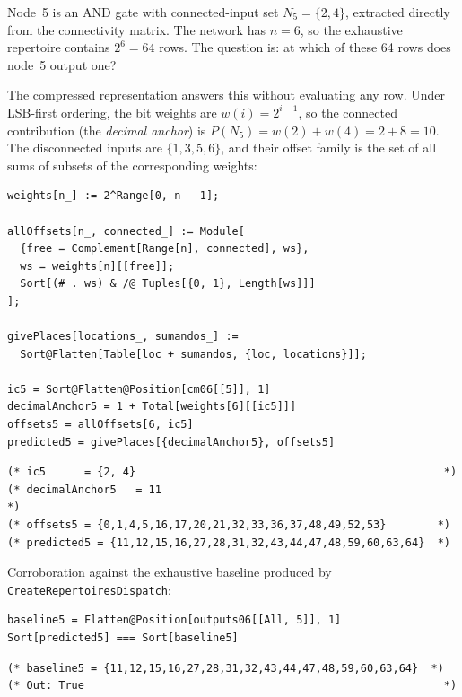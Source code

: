 \documentclass[11pt]{article}
\begin{document}
Node~5 is an AND gate with connected-input set $N_5=\{2,4\}$, extracted
directly from the connectivity matrix.
The network has $n=6$, so the exhaustive repertoire contains $2^6=64$ rows.
The question is: at which of these 64 rows does node~5 output one?

The compressed representation answers this without evaluating any row.
Under LSB-first ordering, the bit weights are $w(i)=2^{i-1}$, so the
connected contribution (the \emph{decimal anchor}) is
$P(N_5) = w(2)+w(4) = 2+8 = 10$.
The disconnected inputs are $\{1,3,5,6\}$, and their offset family is the
set of all sums of subsets of the corresponding weights:

\begin{lstlisting}[style=MathematicaStyle,caption={Computing the offset family and AND deconvolution.}]
weights[n_] := 2^Range[0, n - 1];

allOffsets[n_, connected_] := Module[
  {free = Complement[Range[n], connected], ws},
  ws = weights[n][[free]];
  Sort[(# . ws) & /@ Tuples[{0, 1}, Length[ws]]]
];

givePlaces[locations_, sumandos_] :=
  Sort@Flatten[Table[loc + sumandos, {loc, locations}]];

ic5 = Sort@Flatten@Position[cm06[[5]], 1]
decimalAnchor5 = 1 + Total[weights[6][[ic5]]]
offsets5 = allOffsets[6, ic5]
predicted5 = givePlaces[{decimalAnchor5}, offsets5]
\end{lstlisting}
\begin{lstlisting}[style=MathematicaOutput]
(* ic5      = {2, 4}                                                *)
(* decimalAnchor5   = 11                                                    *)
(* offsets5 = {0,1,4,5,16,17,20,21,32,33,36,37,48,49,52,53}        *)
(* predicted5 = {11,12,15,16,27,28,31,32,43,44,47,48,59,60,63,64}  *)
\end{lstlisting}

Corroboration against the exhaustive baseline produced by
\texttt{CreateRepertoiresDispatch}:

\begin{lstlisting}[style=MathematicaStyle,caption={Verification against exhaustive baseline.}]
baseline5 = Flatten@Position[outputs06[[All, 5]], 1]
Sort[predicted5] === Sort[baseline5]
\end{lstlisting}
\begin{lstlisting}[style=MathematicaOutput]
(* baseline5 = {11,12,15,16,27,28,31,32,43,44,47,48,59,60,63,64}  *)
(* Out: True                                                        *)
\end{lstlisting}
\end{document}
